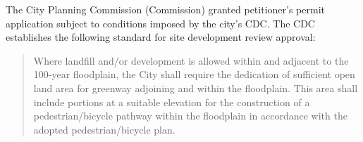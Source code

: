 The City Planning Commission (Commission) granted petitioner's permit
application subject to conditions imposed by the city's CDC. The CDC establishes
the following standard for site development review approval:
\begin{quote}
Where landfill and/or development is allowed within and adjacent to the
100-year floodplain, the City shall require the dedication of sufficient open
land area for greenway adjoining and within the floodplain. This area shall
include portions at a suitable elevation for the construction of a
pedestrian/bicycle pathway within the floodplain in accordance with the adopted
pedestrian/bicycle plan.
\end{quote}

%
%
